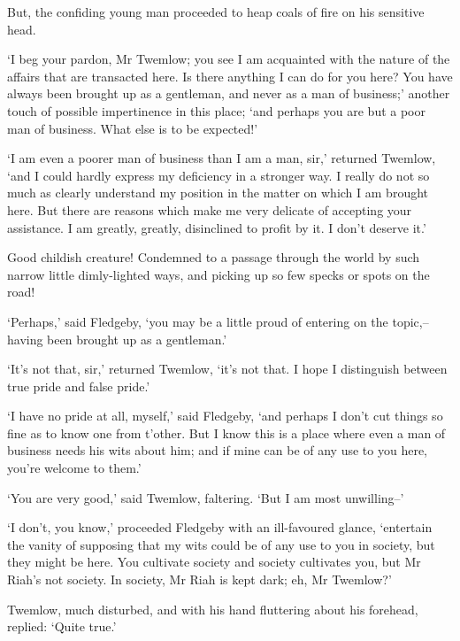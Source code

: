 But, the confiding young man proceeded to heap coals of fire on his
sensitive head.

‘I beg your pardon, Mr Twemlow; you see I am acquainted with the nature
of the affairs that are transacted here. Is there anything I can do for
you here? You have always been brought up as a gentleman, and never as a
man of business;’ another touch of possible impertinence in this place;
‘and perhaps you are but a poor man of business. What else is to be
expected!’

‘I am even a poorer man of business than I am a man, sir,’ returned
Twemlow, ‘and I could hardly express my deficiency in a stronger way. I
really do not so much as clearly understand my position in the matter
on which I am brought here. But there are reasons which make me
very delicate of accepting your assistance. I am greatly, greatly,
disinclined to profit by it. I don’t deserve it.’

Good childish creature! Condemned to a passage through the world by such
narrow little dimly-lighted ways, and picking up so few specks or spots
on the road!

‘Perhaps,’ said Fledgeby, ‘you may be a little proud of entering on the
topic,--having been brought up as a gentleman.’

‘It’s not that, sir,’ returned Twemlow, ‘it’s not that. I hope I
distinguish between true pride and false pride.’

‘I have no pride at all, myself,’ said Fledgeby, ‘and perhaps I don’t
cut things so fine as to know one from t’other. But I know this is a
place where even a man of business needs his wits about him; and if mine
can be of any use to you here, you’re welcome to them.’

‘You are very good,’ said Twemlow, faltering. ‘But I am most
unwilling--’

‘I don’t, you know,’ proceeded Fledgeby with an ill-favoured glance,
‘entertain the vanity of supposing that my wits could be of any use
to you in society, but they might be here. You cultivate society and
society cultivates you, but Mr Riah’s not society. In society, Mr Riah
is kept dark; eh, Mr Twemlow?’

Twemlow, much disturbed, and with his hand fluttering about his
forehead, replied: ‘Quite true.’

